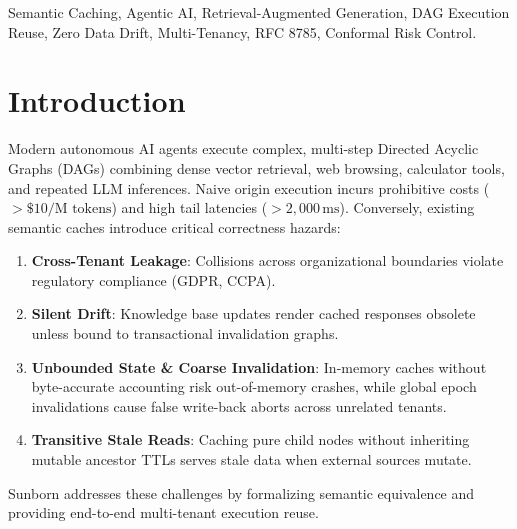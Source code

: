\documentclass[conference]{IEEEtran}
\begin{document}
\begin{IEEEkeywords}
Semantic Caching, Agentic AI, Retrieval-Augmented Generation, DAG Execution Reuse, Zero Data Drift, Multi-Tenancy, RFC 8785, Conformal Risk Control.
\end{IEEEkeywords}

\section{Introduction}
Modern autonomous AI agents execute complex, multi-step Directed Acyclic Graphs (DAGs) combining dense vector retrieval, web browsing, calculator tools, and repeated LLM inferences. Naive origin execution incurs prohibitive costs ($>\$10/\text{M tokens}$) and high tail latencies ($>2{,}000\,\text{ms}$). Conversely, existing semantic caches introduce critical correctness hazards:
\begin{enumerate}
    \item \textbf{Cross-Tenant Leakage}: Collisions across organizational boundaries violate regulatory compliance (GDPR, CCPA).
    \item \textbf{Silent Drift}: Knowledge base updates render cached responses obsolete unless bound to transactional invalidation graphs.
    \item \textbf{Unbounded State \& Coarse Invalidation}: In-memory caches without byte-accurate accounting risk out-of-memory crashes, while global epoch invalidations cause false write-back aborts across unrelated tenants.
    \item \textbf{Transitive Stale Reads}: Caching pure child nodes without inheriting mutable ancestor TTLs serves stale data when external sources mutate.
\end{enumerate}

Sunborn addresses these challenges by formalizing semantic equivalence and providing end-to-end multi-tenant execution reuse.
\end{document}

